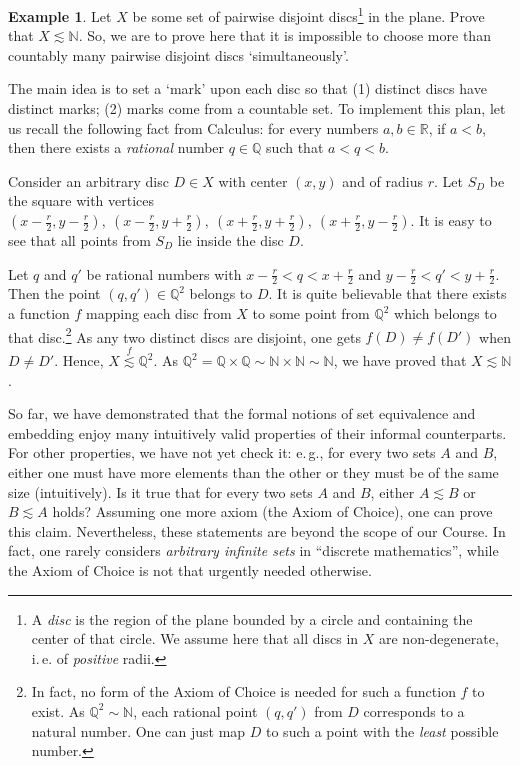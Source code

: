 \documentclass[12pt,notitlepage]{article}
\theoremstyle{plain}
\theoremstyle{definition}
\newtheorem{exm}[thm]{Example}
\theoremstyle{plain}
\newcommand{\N}{\mathbb{N}}
\newcommand{\Q}{\mathbb{Q}}
\newcommand{\R}{\mathbb{R}}
\newcommand{\1}{\mathbf{1}}
\newcommand{\0}{\mathbf{0}}
\begin{document}
\begin{exm} Let $X$ be some set of pairwise disjoint discs\footnote{A \emph{disc} is the region of the plane bounded by a circle and containing the center of that circle. We assume here that all discs in $X$ are non-degenerate, i.\,e. of \emph{positive} radii.} in the plane. Prove that $X \lesssim \N$. So, we are to prove here that it is impossible to choose more than countably many pairwise disjoint discs `simultaneously'.

The main idea is to set a `mark' upon each disc so that (1) distinct discs have distinct marks; (2) marks come from a countable set. To implement this plan, let us recall the following fact from Calculus: for every numbers $a, b \in \R$, if $a < b$, then there exists a \emph{rational} number $q \in \Q$ such that $a < q < b$.

Consider an arbitrary disc $D \in X$ with center $(x, y)$ and of radius $r$. Let $S_D$ be the square with vertices $(x - \frac{r}{2}, y - \frac{r}{2}),\ (x - \frac{r}{2}, y + \frac{r}{2}),\ (x + \frac{r}{2}, y + \frac{r}{2}),\ (x + \frac{r}{2}, y - \frac{r}{2})$. It is easy to see that all points from $S_D$ lie inside the disc $D$.

Let $q$ and $q'$ be rational numbers with $x - \frac{r}{2} < q < x + \frac{r}{2}$ and $y - \frac{r}{2} < q' < y + \frac{r}{2}$. Then the point $(q, q') \in \Q^2$ belongs to $D$. It is quite believable that there exists a function $f$ mapping each disc from $X$ to some point from $\Q^2$ which belongs to that disc.\footnote{In fact, no form of the Axiom of Choice is needed for such a function $f$ to exist. As $\Q^2 \sim \N$, each rational point $(q, q')$ from $D$ corresponds to a natural number. One can just map $D$ to such a point with the \emph{least} possible number.} As any two distinct discs are disjoint, one gets $f(D) \neq f(D')$ when $D \neq D'$. Hence, $X \stackrel{f}{\lesssim} \Q^2$. As $\Q^2 = \Q \times \Q \sim \N \times \N \sim \N$, we have proved that $X \lesssim \N$.
\end{exm}

So far, we have demonstrated that the formal notions of set equivalence and embedding enjoy many intuitively valid properties of their informal counterparts. For other properties, we have not yet check it: e.\,g., for every two sets $A$ and $B$, either one must have more elements than the other or they must be of the same size (intuitively). Is it true that for every two sets $A$ and $B$, either $A \lesssim B$ or $B \lesssim A$ holds? Assuming one more axiom (the Axiom of Choice), one can prove this claim. Nevertheless, these statements are beyond the scope of our Course. In fact, one rarely considers \emph{arbitrary infinite sets} in ``discrete mathematics'', while the Axiom of Choice is not that urgently needed otherwise. 
\end{document}
